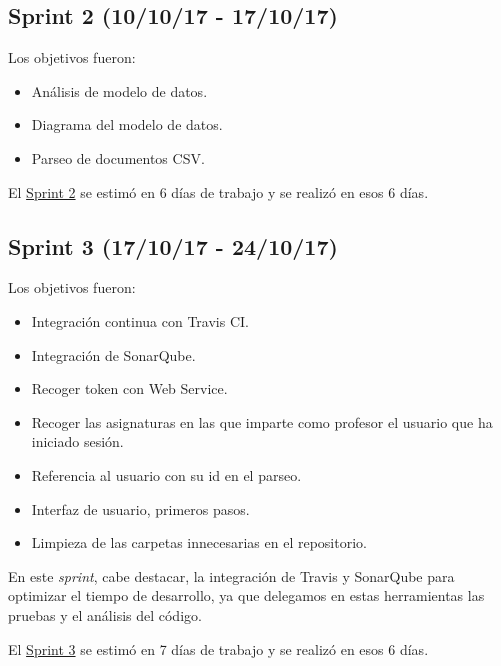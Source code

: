 
\subsection{Sprint 2 (10/10/17 -
	17/10/17)}\label{sprint-2-101017---171017}

Los objetivos fueron:
\begin{itemize}
	\tightlist
	\item
	Análisis de modelo de datos.
	\item
	Diagrama del modelo de datos.
	\item
	Parseo de documentos CSV.	
	
\end{itemize}

El \href{https://github.com/trona85/GII-17.1B-UBULog-1.0/milestone/2?closed=1}{Sprint 2} se estimó en 6 días de trabajo y se realizó en esos 6 días.


\subsection{Sprint 3 (17/10/17 -
	24/10/17)}\label{sprint-3-171017---241017}

Los objetivos fueron:
\begin{itemize}
	\tightlist
	\item
	Integración continua con Travis CI.
	\item
	Integración de  SonarQube.
	\item
	Recoger token con Web Service.	
	\item
	Recoger las asignaturas en las que imparte como profesor el usuario que ha iniciado sesión.
	\item
	Referencia al usuario con su id en el parseo.
	\item
	Interfaz de usuario, primeros pasos.
	\item
	Limpieza de las carpetas innecesarias en el repositorio.
	
\end{itemize}

En este \emph{sprint}, cabe destacar, la integración de Travis\cite{web:travis} y SonarQube \cite{web:sonarqube} para optimizar el tiempo de desarrollo, ya que delegamos en estas herramientas las pruebas y el análisis del código.

El \href{https://github.com/trona85/GII-17.1B-UBULog-1.0/milestone/3?closed=1}{Sprint 3} se estimó en 7 días de trabajo y se realizó en esos 6 días.

